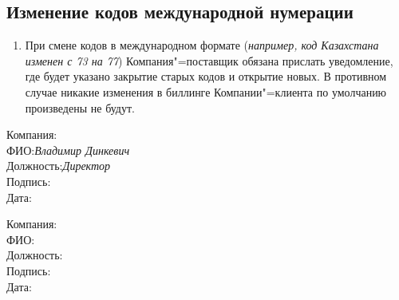 \begin{Form}
  \section{Изменение кодов международной нумерации}
    \begin{enumerate}[label=\thesection.\arabic*.]
     \item При смене кодов в международном формате (\textit{например, код Казахстана изменен с 73 на 77})
           Компания"=поставщик обязана прислать уведомление, где будет указано закрытие старых кодов и открытие новых.
           В противном случае никакие изменения в биллинге Компании"=клиента по умолчанию произведены не будут.
    \end{enumerate}
    
\thispagestyle{appendix-nofooter}

\noindent
\dotfill
\noindent
\vfill
\noindent
\parbox[t]{0.5\linewidth}{
Компания:\hfill\textbf{\ipxpname}\hspace*{0.5cm}\\
ФИО:\hfill\textit{Владимир Динкевич}\hspace*{0.5cm}\\
Должность:\hfill\textit{Директор}\hspace*{0.5cm}\\
Подпись: \hrulefill\hspace*{0.5cm}\\
Дата: \hrulefill\hspace*{0.5cm}\\
}
\hfill
\parbox[t]{0.5\linewidth}{
\hspace*{0.5cm}Компания: \TextField[name=clntname,charsize=10pt,width=62mm,height=1em,align=2,borderwidth=0,bordercolor={1 1 1}]{}\\
\hspace*{0.5cm}ФИО: \TextField[bordersep=1,name=clntattorneyprintname,charsize=10pt,width=69mm,height=1em,align=2,borderwidth=0,bordercolor={1 1 1}]{}\\
\hspace*{0.5cm}Должность: \TextField[name=clntattorneyposition,charsize=10pt,width=60mm,height=1em,align=2,borderwidth=0,bordercolor={1 1 1}]{}\\
\hspace*{0.5cm}Подпись: \hrulefill\\
\hspace*{0.5cm}Дата: \hrulefill\\
}



\end{Form}

